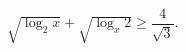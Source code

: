 \begin{ex}[type=inequality]
	\begin{condition}
		$ \sqrt{\log_2 x} + \sqrt{\log_x 2}\geqslant\dfrac{4}{\sqrt{3}} .$
	\end{condition}
\end{ex}